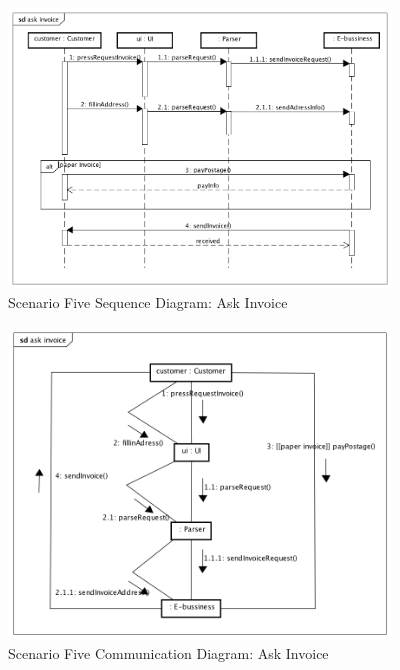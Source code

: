 \documentclass[12pt]{scrreprt}
\begin{document}
\begin{figure}[H]
  \centering\includegraphics[width=4in]{DocumentRes/5SequenceDiagram_askInvoice.png}
  \caption{Scenario Five Sequence Diagram: Ask Invoice}
\end{figure}
\begin{figure}[H]
  \centering\includegraphics[width=4in]{DocumentRes/5CommunicationDiagram_askInvoice.png}
  \caption{Scenario Five Communication Diagram: Ask Invoice}
\end{figure}
\end{document}

